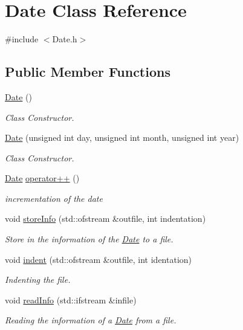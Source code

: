 \hypertarget{class_date}{}\section{Date Class Reference}
\label{class_date}


{\ttfamily \#include $<$Date.\+h$>$}

\subsection*{Public Member Functions}
\begin{DoxyCompactItemize}
\item 
\mbox{\label{class_date_a4e59ed4ba66eec61c27460c5d09fa1bd}} 
\mbox{\hyperlink{class_date_a4e59ed4ba66eec61c27460c5d09fa1bd}{Date}} ()
\begin{DoxyCompactList}\small\item\em Class Constructor. \end{DoxyCompactList}\item 
\mbox{\hyperlink{class_date_a28c6604a0f8ed8216becf24abc20cf5b}{Date}} (unsigned int day, unsigned int month, unsigned int year)
\begin{DoxyCompactList}\small\item\em Class Constructor. \end{DoxyCompactList}\item 
\mbox{\hyperlink{class_date}{Date}} \mbox{\hyperlink{class_date_a0c5386da90c6834a3e7a110b02e2abaa}{operator++}} ()
\begin{DoxyCompactList}\small\item\em incrementation of the date \end{DoxyCompactList}\item 
void \mbox{\hyperlink{class_date_a9385a826469d0978e3491bdff9739f6f}{store\+Info}} (std\+::ofstream \&outfile, int indentation)
\begin{DoxyCompactList}\small\item\em Store in the information of the \mbox{\hyperlink{class_date}{Date}} to a file. \end{DoxyCompactList}\item 
void \mbox{\hyperlink{class_date_af439b0bc0daf90fddce7c74017407a16}{indent}} (std\+::ofstream \&outfile, int identation)
\begin{DoxyCompactList}\small\item\em Indenting the file. \end{DoxyCompactList}\item 
void \mbox{\hyperlink{class_date_ad23dffa000ed62018a399c519acb06db}{read\+Info}} (std\+::ifstream \&infile)
\begin{DoxyCompactList}\small\item\em Reading the information of a \mbox{\hyperlink{class_date}{Date}} from a file. \end{DoxyCompactList}\end{DoxyCompactItemize}


